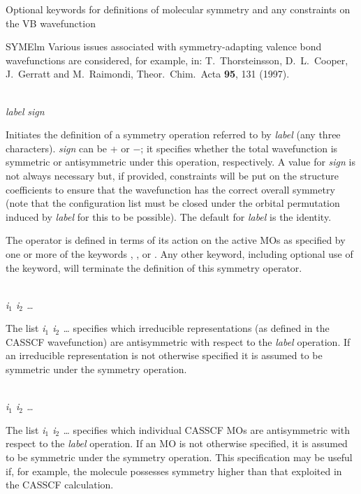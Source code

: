 Optional keywords for definitions of molecular symmetry and any
constraints on the VB wavefunction
\begin{keywordlist}
\item[SYMElm]
Various issues associated with symmetry-adapting valence bond wavefunctions
are considered, for example, in: T.~Thorsteinsson, D.~L.~Co\-oper,
J.~Gerratt and M.~Raimondi, Theor.\ Chim.\ Acta {\bf 95}, 131 (1997).

\\
{\em label} {\em sign}

Initiates the definition of a symmetry operation referred to by {\em label\/} (any three characters).
{\em sign\/} can be + or $-$; it specifies whether the total wavefunction is symmetric or
antisymmetric under this operation, respectively. A value for {\em sign\/} is not always necessary
but, if provided, constraints will be put on the structure coefficients to ensure that the
wavefunction has the correct overall symmetry (note that the configuration list must be closed
under the orbital permutation induced by {\em label\/} for this to be possible).
The default for {\em label\/} is the identity.

The operator is defined in terms of its action on the active MOs as specified by
one or more of the keywords , , or . Any
other keyword, including optional use of the  keyword, will
terminate the definition of this symmetry operator.

\\
{\em i$_1$ i$_2$ \ldots}

The list {\em i$_1$ i$_2$ \ldots} specifies which irreducible representations (as defined in
the CASSCF wavefunction) are antisymmetric with respect to the {\em label\/} operation.
If an irreducible representation is not otherwise specified it is assumed to be symmetric
under the symmetry operation.

\\
{\em i$_1$ i$_2$ \ldots}

The list {\em i$_1$ i$_2$ \ldots} specifies which individual CASSCF MOs are antisymmetric with
respect to the {\em label\/} operation. If an MO is not otherwise specified, it is assumed to be
symmetric under the symmetry operation. This specification may be useful if, for example, the
molecule possesses symmetry higher than that exploited in the CASSCF calculation.


\end{keywordlist}
